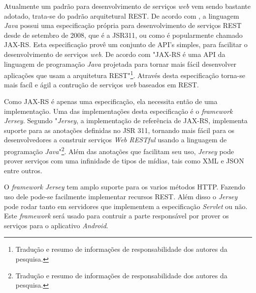 
	\par Atualmente um padrão para desenvolvimento de serviços \textit{web} vem
sendo bastante adotado, trata-se do padrão arquitetural REST. De acordo com
, a linguagem \textit{Java} possui uma especificação
própria para desenvolvimento de serviços REST desde de setembro de 2008, que é
a JSR311, ou como é popularmente chamado JAX-RS. Esta especificação provê um
conjunto de API's simples, para facilitar o desenvolvimento de serviços
\textit{web}. De acordo com  "JAX-RS é uma API da
linguagem de programação \textit{Java} projetada para tornar mais fácil
desenvolver aplicações que usam a arquitetura REST"\footnote{Tradução e resumo
de informações de responsabilidade dos autores da pesquisa.}. Através desta
especificação torna-se mais facíl e ágil a contrução de serviços \textit{web}
baseados em REST.

	\par Como JAX-RS é apenas uma especificação, ela necessita então de uma
implementação. Uma das implementações desta especificação é o
\textit{framework Jersey}. Segundo  "\textit{Jersey}, a
implementação de referência de JAX-RS, implementa suporte para as anotações
definidas no JSR 311, tornando mais fácil para os desenvolvedores a construir
serviços \textit{Web RESTful} usando a linguagem de programação
\textit{Java}"\footnote{Tradução e resumo de informações de responsabilidade
dos autores da pesquisa.}. Além das anotações que facilitam seu uso,
\textit{Jersey} pode prover serviços com uma infinidade de tipos de
mídias, tais como XML e JSON entre outros.

	\par O \textit{framework Jersey} tem amplo suporte para os varios métodos HTTP.
Fazendo uso dele pode-se facilmente implementar recursos REST. Além disso o
\textit{Jersey}  pode rodar tanto em servidores que implementem a especificação
\textit{Servlet} ou não. Este \textit{framework} será usado para contruir a
parte responsável por prover os serviços para o aplicativo \textit{Android}.